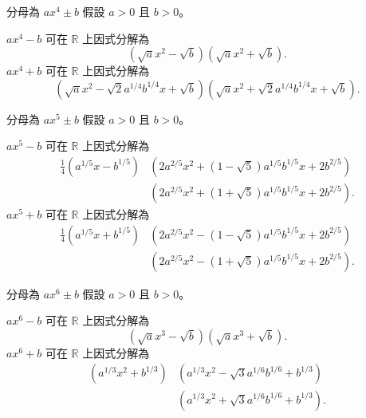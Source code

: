 \documentclass{beamer}
\newcommand{\R}{\mathbb R}
\theoremstyle{remark}
\begin{document}
\begin{CJK}{UTF8}{bsmi}
\begin{frame}{分母為 $ax^4 \pm b$}
  假設 $a > 0$ 且 $b > 0$。
  \begin{theorem}
    $ax^4 - b$ 可在 $\R$ 上因式分解為
    \[\left( \sqrt a x^2 - \sqrt b \right) \left( \sqrt a x^2 + \sqrt b \right).\]
    $ax^4 + b$ 可在 $\R$ 上因式分解為
    \[\left( \sqrt a x^2 - \sqrt2 a^{1/4} b^{1/4} x + \sqrt b \right)
      \left( \sqrt a x^2 + \sqrt2 a^{1/4} b^{1/4} x + \sqrt b \right).\]
  \end{theorem}
\end{frame}

\begin{frame}{分母為 $ax^5 \pm b$}
  假設 $a > 0$ 且 $b > 0$。
  \begin{theorem}
    $ax^5 - b$ 可在 $\R$ 上因式分解為
    \begin{align*}
      \frac14 \left( a^{1/5}x - b^{1/5} \right) 
      &\left( 2 a^{2/5} x^2 + \left( 1 - \sqrt5 \right) a^{1/5} b^{1/5} x + 2b^{2/5} \right)\\
      &\left( 2 a^{2/5} x^2 + \left( 1 + \sqrt5 \right) a^{1/5} b^{1/5} x + 2b^{2/5} \right).
    \end{align*}
    $ax^5 + b$ 可在 $\R$ 上因式分解為
    \begin{align*}
      \frac14 \left( a^{1/5}x + b^{1/5} \right) 
      &\left( 2 a^{2/5} x^2 - \left( 1 - \sqrt5 \right) a^{1/5} b^{1/5} x + 2b^{2/5} \right)\\
      &\left( 2 a^{2/5} x^2 - \left( 1 + \sqrt5 \right) a^{1/5} b^{1/5} x + 2b^{2/5} \right).
    \end{align*}
  \end{theorem}
\end{frame}

\begin{frame}{分母為 $ax^6 \pm b$}
  假設 $a > 0$ 且 $b > 0$。
  \begin{theorem}
    $ax^6 - b$ 可在 $\R$ 上因式分解為
    \[\left( \sqrt a x^3 - \sqrt b \right) \left( \sqrt a x^3 + \sqrt b \right).\]
    $ax^6 + b$ 可在 $\R$ 上因式分解為
    \begin{align*}
      \left( a^{1/3} x^2 + b^{1/3} \right)
      &\left( a^{1/3} x^2 - \sqrt3 a^{1/6} b^{1/6} + b^{1/3} \right)\\
      &\left( a^{1/3} x^2 + \sqrt3 a^{1/6} b^{1/6} + b^{1/3} \right).
    \end{align*}
  \end{theorem}
\end{frame}


\end{CJK}
\end{document}
